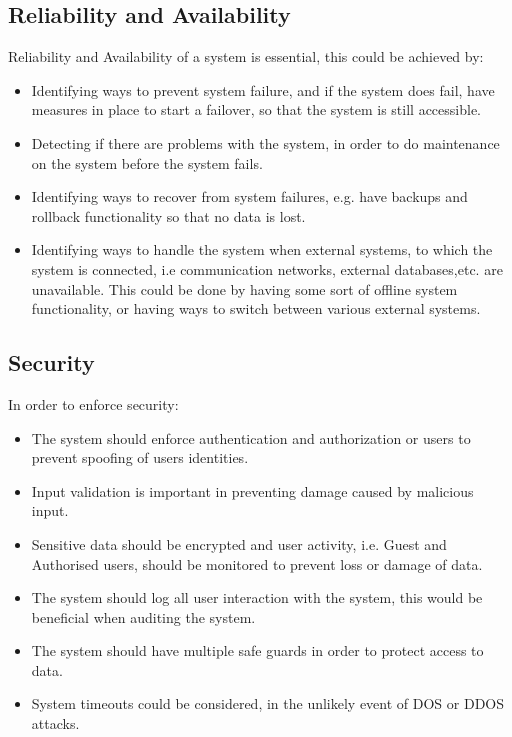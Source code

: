 \subsection{Reliability and Availability}
\begin{flushleft}
Reliability and Availability of a system is essential, this could be achieved by:
\begin{itemize}
\item Identifying ways to prevent system failure, and if the system does fail, have measures in place to start a failover, so that the system is still accessible.
\item Detecting if there are problems with the system, in order to do maintenance on the system before the system fails.
\item Identifying ways to recover from system failures, e.g. have backups and rollback functionality so that no data is lost.
\item Identifying ways to handle the system when external systems, to which the system is connected, i.e communication networks, external databases,etc. are unavailable. This could be done by having some sort of offline system functionality, or having ways to switch between various external systems.
\end{itemize}

\end{flushleft}

\subsection{Security}
\begin{flushleft}
In order to enforce security:
\begin{itemize}
 \item The system should enforce authentication and authorization or users to prevent spoofing of users identities.
 \item Input validation is important in preventing damage caused by malicious input.
 \item Sensitive data should be encrypted and user activity, i.e. Guest and Authorised users, should be monitored to prevent loss or damage of data.
 \item The system should log all user interaction with the system, this would be beneficial when auditing the system.
 \item The system should have multiple safe guards in order to protect access to data.
 \item System timeouts could be considered, in the unlikely event of DOS or DDOS attacks.
\end{itemize}

\end{flushleft}

